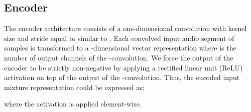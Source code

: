 \subsection{Encoder}
\label{sec:net_arch:encoder}
The encoder  architecture consists of a one-dimensional convolution with kernel size  and stride equal to  similar to \cite{luo2019convTasNet}. Each convolved input audio segment of  samples is transformed to a -dimensional vector representation where  is the number of output channels of the -convolution. We force the output of the encoder to be strictly non-negative by applying a rectified linear unit (ReLU) activation on top of the output of the -convolution. Thus, the encoded input mixture representation could be expressed as:

where the activation  is applied element-wise.

